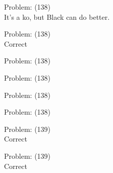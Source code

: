 \documentclass[11pt]{article}
\begin{document}
\begin{minipage}[t]{0.5\textwidth}
  {\centering
  
  Problem: (138)\\
  It's a ko, but Black can do better.\\
  }
\end{minipage}
\begin{minipage}[t]{0.5\textwidth}
  {\centering
  
  Problem: (138)\\
  Correct\\
  }
\end{minipage}
\begin{minipage}[t]{0.5\textwidth}
  {\centering
  
  Problem: (138)\\
  
  }
\end{minipage}
\begin{minipage}[t]{0.5\textwidth}
  {\centering
  
  Problem: (138)\\
  
  }
\end{minipage}
\begin{minipage}[t]{0.5\textwidth}
  {\centering
  
  Problem: (138)\\
  
  }
\end{minipage}
\begin{minipage}[t]{0.5\textwidth}
  {\centering
  
  Problem: (138)\\
  
  }
\end{minipage}
\begin{minipage}[t]{0.5\textwidth}
  {\centering
  
  Problem: (139)\\
  Correct\\
  }
\end{minipage}
\begin{minipage}[t]{0.5\textwidth}
  {\centering
  
  Problem: (139)\\
  Correct\\
  }
\end{minipage}
\end{document}
